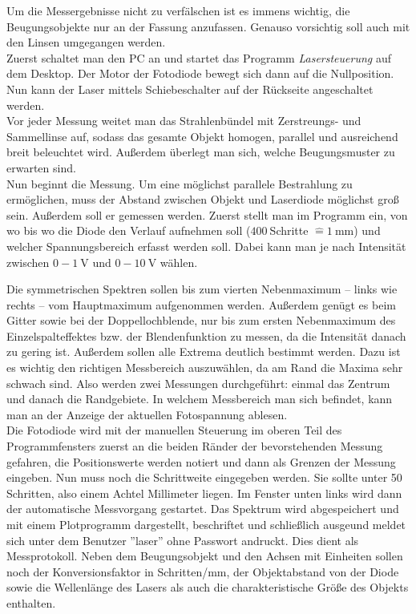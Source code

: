 \documentclass[12pt,a4paper,titlepage,headinclude,bibtotoc]{scrartcl}
\newcommand{\corresponds}{\ensuremath{\mathrel{\widehat{=}}}}
\begin{document}
Um die Messergebnisse nicht zu verfälschen ist es immens wichtig, die Beugungsobjekte nur an der Fassung anzufassen.
Genauso vorsichtig soll auch mit den Linsen umgegangen werden.\\

Zuerst schaltet man den PC an und startet das Programm \emph{Lasersteuerung} auf dem Desktop.
Der Motor der Fotodiode bewegt sich dann auf die Nullposition.
Nun kann der Laser mittels Schiebeschalter auf der Rückseite angeschaltet werden.\\

Vor jeder Messung weitet man das Strahlenbündel mit Zerstreungs- und Sammellinse auf, sodass das gesamte Objekt homogen, parallel und ausreichend breit beleuchtet wird.
Außerdem überlegt man sich, welche Beugungsmuster zu erwarten sind.\\

Nun beginnt die Messung.
Um eine möglichst parallele Bestrahlung zu ermöglichen, muss der Abstand zwischen Objekt und Laserdiode möglichst groß sein.
Außerdem soll er gemessen werden.
Zuerst stellt man im Programm ein, von wo bis wo die Diode den Verlauf aufnehmen soll ($400~$Schritte $\corresponds 1~$mm) und welcher Spannungsbereich erfasst werden soll.
Dabei kann man je nach Intensität zwischen $0-1~$V und $0-10~$V wählen.

Die symmetrischen Spektren sollen bis zum vierten Nebenmaximum -- links wie rechts -- vom Hauptmaximum aufgenommen werden.
Außerdem genügt es beim Gitter sowie bei der Doppellochblende, nur bis zum ersten Nebenmaximum des Einzelspalteffektes bzw. der Blendenfunktion zu messen, da die Intensität danach zu gering ist.
Außerdem sollen alle Extrema deutlich bestimmt werden.
Dazu ist es wichtig den richtigen Messbereich auszuwählen, da am Rand die Maxima sehr schwach sind.
Also werden zwei Messungen durchgeführt: einmal das Zentrum und danach die Randgebiete.
In welchem Messbereich man sich befindet, kann man an der Anzeige der aktuellen Fotospannung ablesen.\\

Die Fotodiode wird mit der  manuellen Steuerung im oberen Teil des Programmfensters zuerst an die beiden Ränder der bevorstehenden Messung gefahren, die Positionswerte werden notiert und dann als Grenzen der Messung eingeben.
Nun muss noch die Schrittweite eingegeben werden.
Sie sollte unter 50 Schritten, also einem Achtel Millimeter liegen.
Im Fenster unten links wird dann der automatische Messvorgang gestartet.
Das Spektrum wird abgespeichert und mit einem Plotprogramm dargestellt, beschriftet und schließlich ausgeund meldet sich unter dem Benutzer ''laser'' ohne Passwort andruckt.
Dies dient als Messprotokoll.
Neben dem Beugungsobjekt und den Achsen mit Einheiten sollen noch der Konversionsfaktor in Schritten/mm, der Objektabstand von der Diode sowie die Wellenlänge des Lasers als auch die charakteristische Größe des Objekts enthalten.\\
\end{document}
